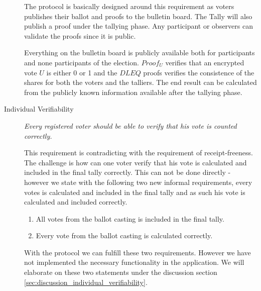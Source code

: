 \begin{description}
        \noindent
        The protocol is basically designed around this requirement as voters publishes their ballot and proofs to the bulletin board. The Tally will also publish a proof under the tallying phase. Any participant or observers can validate the proofs since it is public. 
        
        
        \noindent
        Everything on the bulletin board is publicly available both for participants and none participants of the election. $Proof_U$ verifies that an encrypted vote $U$ is either 0 or 1 and the $DLEQ$ proofs verifies the consistence of the shares for both the voters and the talliers. The end result can be calculated from the publicly known information available after the tallying phase. 
            
    \item[Individual Verifiability]
        \textit{Every registered voter should be able to verify that his vote is counted correctly.}
        
        This requirement is contradicting with the requirement of receipt-freeness. The challenge is how can one voter verify that his vote 
        is calculated and included in the final tally correctly. This can not be done directly - however we state with the following two new informal requirements, every votes is calculated and included in the final tally and as such his vote is calculated and included correctly.
        \begin{enumerate}
            \item All votes from the ballot casting is included in the final tally.
            \item Every vote from the ballot casting is calculated correctly.
        \end{enumerate}
        
        \noindent        
        With the protocol we can fulfill these two requirements. However we have not implemented the necessary functionality in the application.  We will elaborate on these two statements under the discussion section \ref{sec:discussion_individual_verifiability}. 
        
    \end{description}

